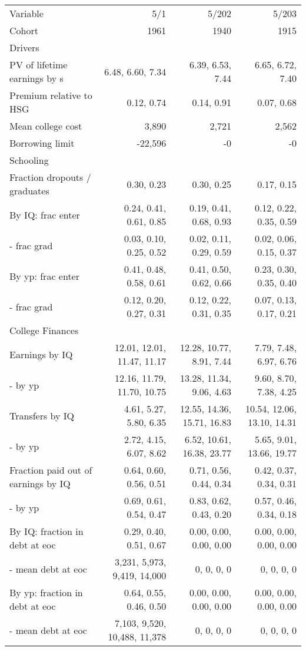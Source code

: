 \begin{tabular}{lrrr}
\hline
Variable & 5/1  & 5/202  & 5/203  \\
Cohort & 1961  & 1940  & 1915  \\
Drivers &   &   &   \\
PV of lifetime earnings by s & 6.48, 6.60, 7.34  & 6.39, 6.53, 7.44  & 6.65, 6.72, 7.40  \\
Premium relative to HSG & 0.12, 0.74  & 0.14, 0.91  & 0.07, 0.68  \\
Mean college cost & 3,890  & 2,721  & 2,562  \\
Borrowing limit & -22,596  & -0  & -0  \\
\hline
Schooling &   &   &   \\
Fraction dropouts / graduates & 0.30, 0.23  & 0.30, 0.25  & 0.17, 0.15  \\
By IQ: frac enter & 0.24, 0.41, 0.61, 0.85  & 0.19, 0.41, 0.68, 0.93  & 0.12, 0.22, 0.35, 0.59  \\
- frac grad & 0.03, 0.10, 0.25, 0.52  & 0.02, 0.11, 0.29, 0.59  & 0.02, 0.06, 0.15, 0.37  \\
By yp: frac enter & 0.41, 0.48, 0.58, 0.61  & 0.41, 0.50, 0.62, 0.66  & 0.23, 0.30, 0.35, 0.40  \\
- frac grad & 0.12, 0.20, 0.27, 0.31  & 0.12, 0.22, 0.31, 0.35  & 0.07, 0.13, 0.17, 0.21  \\
\hline
College Finances &   &   &   \\
Earnings by IQ & 12.01, 12.01, 11.47, 11.17  & 12.28, 10.77, 8.91, 7.44  & 7.79, 7.48, 6.97, 6.76  \\
- by yp & 12.16, 11.79, 11.70, 10.75  & 13.28, 11.34, 9.06, 4.63  & 9.60, 8.70, 7.38, 4.25  \\
Transfers by IQ & 4.61, 5.27, 5.80, 6.35  & 12.55, 14.36, 15.71, 16.83  & 10.54, 12.06, 13.10, 14.31  \\
- by yp & 2.72, 4.15, 6.07, 8.62  & 6.52, 10.61, 16.38, 23.77  & 5.65, 9.01, 13.66, 19.77  \\
Fraction paid out of earnings by IQ & 0.64, 0.60, 0.56, 0.51  & 0.71, 0.56, 0.44, 0.34  & 0.42, 0.37, 0.34, 0.31  \\
- by yp & 0.69, 0.61, 0.54, 0.47  & 0.83, 0.62, 0.43, 0.20  & 0.57, 0.46, 0.34, 0.18  \\
By IQ: fraction in debt at eoc & 0.29, 0.40, 0.51, 0.67  & 0.00, 0.00, 0.00, 0.00  & 0.00, 0.00, 0.00, 0.00  \\
- mean debt at eoc & 3,231, 5,973, 9,419, 14,000  & 0, 0, 0, 0  & 0, 0, 0, 0  \\
By yp: fraction in debt at eoc & 0.64, 0.55, 0.46, 0.50  & 0.00, 0.00, 0.00, 0.00  & 0.00, 0.00, 0.00, 0.00  \\
- mean debt at eoc & 7,103, 9,520, 10,488, 11,378  & 0, 0, 0, 0  & 0, 0, 0, 0  \\
\hline
\end{tabular}%
